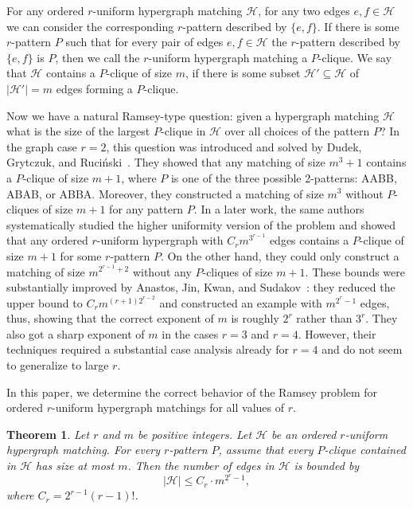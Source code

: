 \documentclass{aic}
\newtheorem{theorem}{Theorem}[section]
\theoremstyle{definition}
\numberwithin{equation}{section}
\numberwithin{figure}{section}
\newcommand{\su}{\subseteq}
\newcommand{\HH}{\mathcal{H}}
\begin{document}
For any ordered $r$-uniform hypergraph matching $\HH$, for any two edges $e,f\in\HH$ we can consider the corresponding $r$-pattern described by $\{ e,f\}$. If there is some $r$-pattern $P$ such that for every pair of edges $e,f\in\HH$ the $r$-pattern described by $\{ e,f\}$ is $P$, then we call the $r$-uniform hypergraph matching a $P$-clique. We say that $\HH$ contains a $P$-clique of size $m$, if there is some subset $\HH'\su \HH$ of $|\HH'|=m$ edges forming a $P$-clique.

Now we have a natural Ramsey-type question: given a hypergraph matching $\HH$ what is the size of the largest $P$-clique in $\HH$ over all choices of the pattern $P$? In the graph case $r=2$, this question was introduced and solved by
Dudek, Grytczuk, and Ruci\'nski~\cite{DGR22}. They showed that any matching of size $m^3+1$ contains a $P$-clique of size $m+1$, where $P$ is one of the three possible 2-patterns: AABB, ABAB, or ABBA. Moreover, they constructed a matching of size $m^3$ without $P$-cliques of size $m+1$ for any pattern $P$. 
In a later work, the same authors~\cite{DGR} systematically studied the higher uniformity version of the problem and showed that any ordered $r$-uniform hypergraph with $C_r m^{3^{r-1}}$ edges contains a $P$-clique of size $m+1$ for some $r$-pattern $P$. On the other hand, they could only construct a matching of size $m^{2^{r-1}+2}$ without any $P$-cliques of size $m+1$. These bounds were substantially improved by Anastos, Jin, Kwan, and Sudakov~\cite{AJKS}: they reduced the upper bound to $C_r m^{(r+1) 2^{r-2}}$ and constructed an example with $m^{2^{r}-1}$ edges, thus, showing that the correct exponent of $m$ is roughly $2^r$ rather than $3^r$. They also got a sharp exponent of $m$ in the cases $r=3$ and $r=4$. However, their techniques required a substantial case analysis already for $r=4$ and do not seem to generalize to large $r$.

In this paper, we determine the correct behavior of the Ramsey problem for ordered $r$-uniform hypergraph matchings for all values of $r$.

\begin{theorem} \label{thm-main}
Let $r$ and $m$ be positive integers. Let $\HH$ be an ordered $r$-uniform hypergraph matching. For every $r$-pattern $P$, assume that every $P$-clique contained in $\HH$ has size at most $m$. Then the number of edges in $\HH$ is bounded by
\[|\HH|\le C_r\cdot m^{2^r-1},\]
where $C_r=2^{r-1}(r-1)!$.
\end{theorem}
\end{document}

